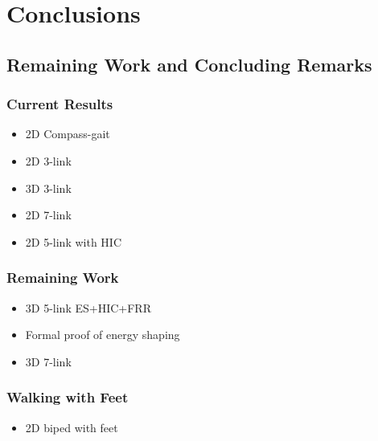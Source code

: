 \section{Conclusions}
\showtoc

\subsection{Remaining Work and Concluding Remarks}
\begin{frame}
  \frametitle{Current Results}
  \begin{itemize}
  \item 2D Compass-gait
  \item 2D 3-link
  \item 3D 3-link
  \item 2D 7-link
  \item 2D 5-link with HIC
  \end{itemize}
\end{frame}

\begin{frame}
  \frametitle{Remaining Work}
  \begin{itemize}
  \item 3D 5-link ES+HIC+FRR
  \item Formal proof of energy shaping
  \item 3D 7-link
  \end{itemize}
\end{frame}

\begin{frame}
  \frametitle{Walking with Feet}
  \begin{itemize}
  \item 2D biped with feet
  \end{itemize}
\end{frame}
